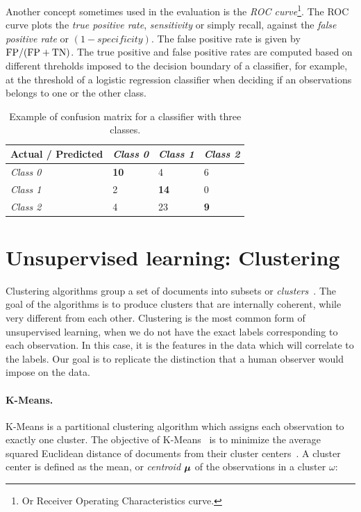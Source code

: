 
Another concept sometimes used in the evaluation is the {\em ROC
curve}\footnote{Or Receiver Operating Characteristics curve.}. 
%
The ROC curve plots the {\em true positive rate}, {\em sensitivity} or simply
recall, against the {\em false positive rate} or $(1 - \mathit{specificity})$.
%
The false positive rate is given by $\text{FP}/(\text{FP} + \text{TN})$.
%
The true positive and false positive rates are computed based on different
threholds imposed to the decision boundary of a classifier, for example, at the
threshold of a logistic regression classifier when deciding if an observations
belongs to one or the other class.


\begin{table}[]
    \centering
    \begin{tabular}{@{}llll@{}}
    \toprule
    Actual / Predicted & \textit{Class 0} & \textit{Class 1} & \textit{Class 2} \\ \midrule
    \textit{Class 0}   & \textbf{10}      & 4                & 6                \\
    \textit{Class 1}   & 2                & \textbf{14}      & 0                \\
    \textit{Class 2}   & 4                & 23               & \textbf{9}       \\ \bottomrule
    \end{tabular}
    \caption{Example of confusion matrix for a classifier with three classes.}
    \label{tab:background:example-conf-matrix}
    \end{table}

\section{Unsupervised learning: Clustering}

Clustering algorithms group a set of documents into subsets or {\em
clusters}~\cite{manning2010introduction}.
%
The goal of the algorithms is to produce clusters that are internally coherent,
while very different from each other.
%
Clustering is the most common form of unsupervised learning, when we do not have
the exact labels corresponding to each observation. 
%
In this case, it is the features in the data which will correlate to the labels.
%
Our goal is to replicate the distinction that a human observer would impose on
the data.


\paragraph{K-Means.} 
%
K-Means is a partitional clustering algorithm which assigns each observation to
exactly one cluster.
%
The objective of K-Means~\cite{lloyd1982least} is to minimize the average
squared Euclidean distance of documents from their cluster
centers~\cite{manning2010introduction}.
%
A cluster center is defined as the mean, or {\em centroid} $\boldsymbol{\mathbf{\mu}}$ of the
observations in a cluster $\omega$:

